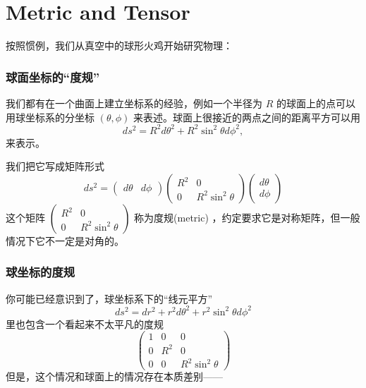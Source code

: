\documentclass[CJK,13pt]{beamer}
\date{}
\begin{document}
  \bch
{}


\section{Metric and Tensor}


\begin{frame}
  按照惯例，我们从真空中的球形火鸡开始研究物理：


  
\end{frame}

\begin{frame}
  \frametitle{球面坐标的“度规”}
  我们都有在一个曲面上建立坐标系的经验，例如一个半径为 $R$ 的球面上的点可以用球坐标系的分坐标 $(\theta,\phi)$ 来表述。球面上很接近的两点之间的距离平方可以用
  $$ ds^2 = R^2d\theta^2 + R^2\sin^2\theta d\phi^2, $$
  来表示。

  我们把它写成矩阵形式
  $$ ds^2 =  \begin{pmatrix}
    d\theta & d\phi 
  \end{pmatrix}
  \begin{pmatrix}
    R^2 & 0 \\
    0 & R^2\sin^2\theta
  \end{pmatrix}
 \begin{pmatrix}
   d\theta \\
   d\phi 
  \end{pmatrix}  
 $$
 这个矩阵
 $\begin{pmatrix}  R^2 & 0 \\    0 & R^2\sin^2\theta  \end{pmatrix}$
 称为{\blue 度规(metric)} ，约定要求它是对称矩阵，但{\blue 一般情况下它不一定是对角的}。
\end{frame}

\begin{frame}
  \frametitle{球坐标的度规}
  你可能已经意识到了，球坐标系下的“线元平方”
  $$ ds^2 = dr^2 + r^2d\theta^2 + r^2\sin^2\theta d\phi^2$$
  里也包含一个看起来不太平凡的度规
  $$
  \begin{pmatrix}
    1 & 0   & 0 \\
    0 & R^2 & 0 \\
    0 & 0   & R^2\sin^2\theta
  \end{pmatrix}
  $$
  但是，这个情况和球面上的情况存在本质差别——
\end{frame}
\end{document}
